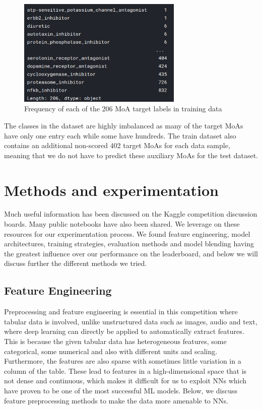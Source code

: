 \documentclass{article}
\begin{document}
\begin{figure}[H]
\begin{center}
	\includegraphics[width=0.7\textwidth]{pics/scored_labels.png}
    \caption{Frequency of each of the 206 MoA target labels in training data}
\label{fig:scored_labels}
\end{center}
\end{figure}

The classes in the dataset are highly imbalanced as many of the target MoAs have only one entry each while some have hundreds. The train dataset also contains an additional non-scored 402 target MoAs for each data sample, meaning that we do not have to predict these auxiliary MoAs for the test dataset.


\section{Methods and experimentation}
Much useful information has been discussed on the Kaggle competition discussion boards. Many public notebooks have also been shared. We leverage on these resources for our experimentation process. We found feature engineering, model architectures, training strategies, evaluation methods and model blending having the greatest influence over our performance on the leaderboard, and below we will discuss further the different methods we tried.

\subsection{Feature Engineering}
Preprocessing and feature engineering is essential in this competition where tabular data is involved, unlike unstructured data such as images, audio and text, where deep learning can directly be applied to automatically extract features. This is because the given tabular data has heterogeneous features, some categorical, some numerical and also with different units and scaling. Furthermore, the features are also sparse with sometimes little variation in a column of the table. These lead to features in a high-dimensional space that is not dense and continuous, which makes it difficult for us to exploit NNs which have proven to be one of the most successful ML models. Below, we discuss feature preprocessing methods to make the data more amenable to NNs.
\end{document}
